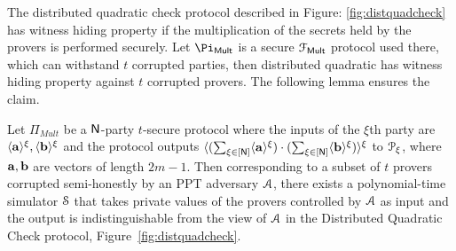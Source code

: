 The distributed quadratic check protocol described in Figure: \ref{fig:distquadcheck} has witness hiding property if the multiplication of the secrets held by the provers is performed securely. Let $\Pi_{\sf Mult}$ is a secure $\mathcal{F}_{\sf Mult}$ protocol used there, which can withstand $t$ corrupted parties, then distributed quadratic has witness hiding property against $t$ corrupted provers. The following lemma ensures the claim. 
\begin{lemma}\label{lem:WHquad}
	Let $\Pi_{Mult}$ be a $\mathsf{N}$-party $t$-secure protocol where the inputs of the $\xi$th party are $\langle{\bf a}\rangle^\xi, \langle{\bf b}\rangle^\xi$ and the protocol outputs $\langle{(\sum_{\xi\in[\mathsf{N}]} \langle{\bf a}\rangle^\xi) \cdot (\sum_{\xi\in[\mathsf{N}]} \langle{\bf b}\rangle^\xi)}\rangle^\xi$ to $\mathcal{P}_\xi$, where ${\bf a}, {\bf b}$ are vectors of length $2m-1$. Then corresponding to a subset of $t$ provers corrupted semi-honestly by an PPT adversary $\mathcal{A}$, there exists a polynomial-time simulator $\mathcal{S}$ that takes private values of the provers controlled by $\mathcal{A}$ as input and the output is indistinguishable from the view of $\mathcal{A}$ in the Distributed Quadratic Check protocol, Figure~\ref{fig:distquadcheck}.
\end{lemma}
